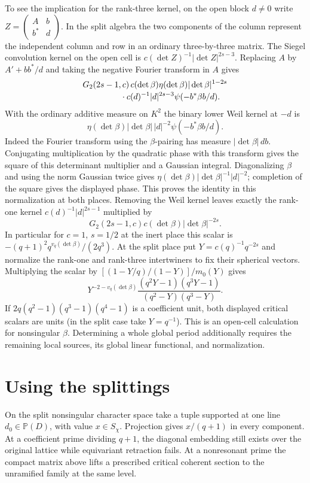 \documentclass[11pt]{article}
\begin{document}
To see the implication for the rank-three kernel, on the open block
$d\ne0$ write
$Z=\left(\begin{smallmatrix}A&b\\b^*&d\end{smallmatrix}\right)$.
In the split algebra the two components of the column represent
the independent column and row in an ordinary three-by-three matrix.
The Siegel convolution kernel on the open cell is
$c(\det Z)^{-1}|\det Z|^{2s-3}$. Replacing $A$ by $A'+bb^*/d$ and
taking the negative Fourier transform in $A$ gives
\begin{align*}
 &G_2(2s-1,c)\,c(\det\beta)\eta(\det\beta)
    |\det\beta|^{1-2s}\\[-2pt]
 &\hspace{16mm}\cdot c(d)^{-1}|d|^{2s-3}
           \psi(-b^*\beta b/d).
\end{align*}
With the ordinary additive measure on $K^2$ the binary lower Weil
kernel at $-d$ is
\[\eta(\det\beta)|\det\beta|\,|d|^{-2}\psi(-b^*\beta b/d).\]
Indeed the Fourier transform using the
$\beta$-pairing has measure $|\det\beta|\,db$. Conjugating
multiplication by the quadratic phase with this transform gives
the square of this determinant multiplier and a Gaussian integral.
Diagonalizing $\beta$ and using the norm Gaussian twice gives
$\eta(\det\beta)|\det\beta|^{-1}|d|^{-2}$; completion of the square
gives the displayed phase. This proves the identity in this
normalization at both places. Removing the Weil kernel leaves exactly
the rank-one kernel $c(d)^{-1}|d|^{2s-1}$ multiplied by
\[
                G_2(2s-1,c)c(\det\beta)|\det\beta|^{-2s}.
\]
In particular for $c=1$, $s=1/2$ at the inert place this scalar is
$-(q+1)^2 q^{v_q(\det\beta)}/(2q^3)$. At the split place put
$Y=c(q)^{-1}q^{-2s}$ and normalize the rank-one and rank-three
intertwiners to fix their spherical vectors. Multiplying the scalar
by $[(1-Y/q)/(1-Y)]/m_0(Y)$ gives
\[
       Y^{-2-v_q(\det\beta)}
       \frac{(q^2Y-1)(q^3Y-1)}{(q^2-Y)(q^3-Y)} .
\]
If $2q(q^2-1)(q^3-1)(q^4-1)$ is a coefficient unit, both displayed
critical scalars are units (in the split case take $Y=q^{-1}$).
This is an open-cell calculation for nonsingular $\beta$.
Determining a whole global period additionally requires the remaining
local sources, its global linear functional, and normalization.

\section{Using the splittings}
On the split nonsingular character space take a tuple supported at
one line $d_0\in\mathbb P(D)$, with value $x\in S_\chi$. Projection
gives $x/(q+1)$ in every component. At a coefficient prime dividing
$q+1$, the diagonal embedding still exists over the original lattice
while equivariant retraction fails. At a nonresonant prime the compact
matrix above lifts a prescribed critical coherent section to the
unramified family at the same level.
\end{document}
